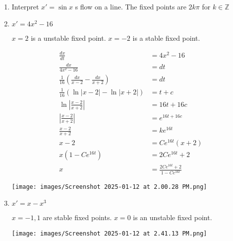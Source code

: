 \documentclass[12pt]{article}
\begin{document}

\begin{enumerate}[start=1,label={\bfseries Problem \arabic*:},leftmargin=1in] %
    \item Interpret $x' = \sin x$ s flow on a line. The fixed points are $2k\pi$ for $k \in \mathbb{Z}$ 
    \item $x' = 4x^2-16$
    

    $x = 2$ is a unstable fixed point. $x=-2$ is a stable fixed point.

    \begin{align*}
        \frac{dx}{dt}&=4x^2-16\\
        \frac{dx}{4x^2-16}&=dt\\
        \frac{1}{16}(\frac{dx}{x-2}-\frac{dx}{x+2}) &= dt \\
        \frac{1}{16} (\ln|x-2| - \ln|x+2|) &= t + c\\
        \ln|\frac{x-2}{x+2}| &= 16t + 16c\\
        |\frac{x-2}{x+2}| &= e^{16t + 16c}\\
        \frac{x-2}{x+2} &= ke^{16t}\\
        x-2 &= Ce^{16t}(x+2)\\
        x(1 - Ce^{16t}) &= 2Ce^{16t} + 2\\
        x &= \frac{2Ce^{16t}+2}{1-Ce^{16t}}
    \end{align*}

    \texttt{[image: images/Screenshot 2025-01-12 at 2.00.28 PM.png]}

    \item $x' = x - x^3$
    
    $x = -1, 1$ are stable fixed points. $x = 0$ is an unstable fixed point. 

    \texttt{[image: images/Screenshot 2025-01-12 at 2.41.13 PM.png]}
\end{enumerate}
\end{document}
